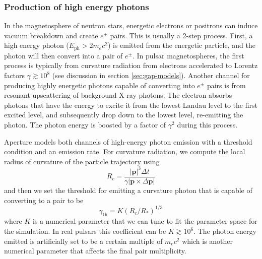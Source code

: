 \subsubsection{Production of high energy photons}
\label{sec:instant-pair}

In the magnetosphere of neutron stars, energetic electrons or positrons can
induce vacuum breakdown and create $e^{\pm}$ pairs. This is usually a 2-step
process. First, a high energy photon ($E_\mathrm{ph} > 2m_{e}c^2$) is emitted
from the energetic particle, and the photon will then convert into a pair of
$e^{\pm}$. In pulsar magnetospheres, the first process is typically from
curvature radiation from electrons accelerated to Lorentz factors $\gamma
\gtrsim 10^{8}$ (see discussion in section \ref{sec:gap-models}). Another
channel for producing highly energetic photons capable of converting into
$e^{\pm}$ pairs is from resonant upscattering of background X-ray photons. The
electron absorbs photons that have the energy to excite it from the lowest
Landau level to the first excited level, and subsequently drop down to the
lowest level, re-emitting the photon. The photon energy is boosted by a factor
of $\gamma^2$ during this process.


Aperture models both channels of high-energy photon emission with a threshold
condition and an emission rate. For curvature radiation, we compute the local
radius of curvature of the particle trajectory using
\begin{equation}
  \label{eq:curvature-radius}
  R_{c} = \frac{|\mathbf{p}|^3\Delta t}{\gamma \left| \mathbf{p} \times \Delta \mathbf{p} \right|}
\end{equation}
and then we set the threshold for emitting a curvature photon that is capable of
converting to a pair to be
\begin{equation}
  \label{eq:curvature-threshold}
  \gamma_\mathrm{th} = K(R_{c}/R_{*})^{1/3}
\end{equation}
where $K$ is a numerical parameter that we can tune to fit the parameter space
for the simulation. In real pulsars this coefficient can be $K\gtrsim 10^{6}$.
The photon energy emitted is artificially set to be a certain multiple of
$m_{e}c^2$ which is another numerical parameter that affects the final pair
multiplicity.

